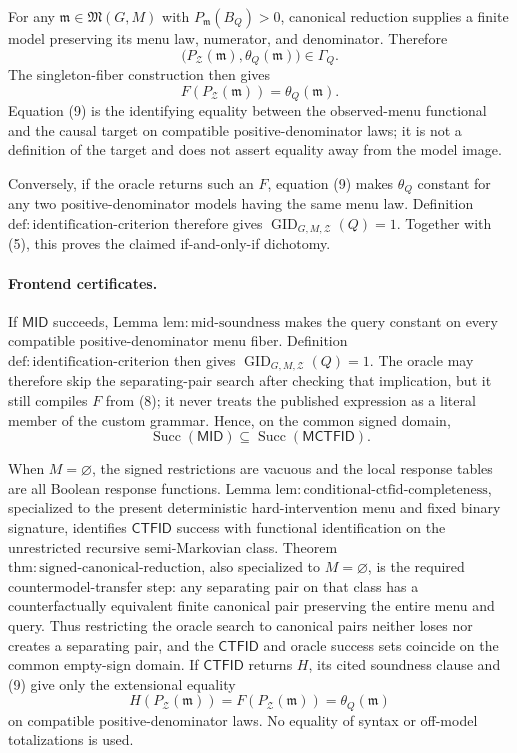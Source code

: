 For any \(\mathfrak m\in\mathfrak M(G,M)\) with \(P_{\mathfrak m}(B_Q)>0\), canonical reduction supplies a finite model preserving its menu law, numerator, and denominator.  Therefore
\[
 \bigl(P_{\mathcal Z}(\mathfrak m),\theta_Q(\mathfrak m)\bigr)\in\Gamma_Q.
\]
The singleton-fiber construction then gives
\[
 F(P_{\mathcal Z}(\mathfrak m))=\theta_Q(\mathfrak m).
\tag{9}
\]
Equation (9) is the identifying equality between the observed-menu functional and the causal target on compatible positive-denominator laws; it is not a definition of the target and does not assert equality away from the model image.

Conversely, if the oracle returns such an \(F\), equation (9) makes \(\theta_Q\) constant for any two positive-denominator models having the same menu law.  Definition \(\mathrm{def:identification\text{-}criterion}\) therefore gives \(\operatorname{GID}_{G,M,\mathcal Z}(Q)=1\).  Together with (5), this proves the claimed if-and-only-if dichotomy.

\paragraph{Frontend certificates.}
If \(\mathsf{MID}\) succeeds, Lemma \(\mathrm{lem:mid\text{-}soundness}\) makes the query constant on every compatible positive-denominator menu fiber.  Definition \(\mathrm{def:identification\text{-}criterion}\) then gives \(\operatorname{GID}_{G,M,\mathcal Z}(Q)=1\).  The oracle may therefore skip the separating-pair search after checking that implication, but it still compiles \(F\) from (8); it never treats the published expression as a literal member of the custom grammar.  Hence, on the common signed domain,
\[
 \operatorname{Succ}(\mathsf{MID})
 \subseteq
 \operatorname{Succ}(\mathsf{MCTFID}).
\tag{10}
\]

When \(M=\varnothing\), the signed restrictions are vacuous and the local response tables are all Boolean response functions.  Lemma \(\mathrm{lem:conditional\text{-}ctfid\text{-}completeness}\), specialized to the present deterministic hard-intervention menu and fixed binary signature, identifies \(\mathsf{CTFID}\) success with functional identification on the unrestricted recursive semi-Markovian class.  Theorem \(\mathrm{thm:signed\text{-}canonical\text{-}reduction}\), also specialized to \(M=\varnothing\), is the required countermodel-transfer step: any separating pair on that class has a counterfactually equivalent finite canonical pair preserving the entire menu and query.  Thus restricting the oracle search to canonical pairs neither loses nor creates a separating pair, and the \(\mathsf{CTFID}\) and oracle success sets coincide on the common empty-sign domain.  If \(\mathsf{CTFID}\) returns \(H\), its cited soundness clause and (9) give only the extensional equality
\[
 H(P_{\mathcal Z}(\mathfrak m))
 =F(P_{\mathcal Z}(\mathfrak m))
 =\theta_Q(\mathfrak m)
\]
on compatible positive-denominator laws.  No equality of syntax or off-model totalizations is used.


